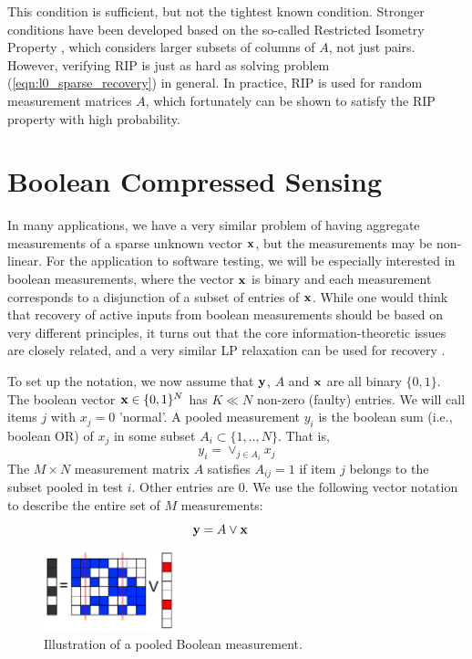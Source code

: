 This condition is sufficient, but not the tightest known condition.
Stronger conditions have been developed based on the so-called Restricted Isometry Property
\cite{candes2008_RIP}, which considers larger subsets of columns of $A$, not just pairs.
However, verifying RIP is just as hard as solving problem (\ref{eqn:l0_sparse_recovery}) in general. In practice, RIP is used for random measurement
matrices $A$, which fortunately can be shown to satisfy the RIP property with high probability.

\section{ Boolean Compressed Sensing}
\label{s:boolean_compressed_sensing}
In many applications, we have a very similar problem of having aggregate measurements
of a sparse unknown vector $\mathbf{x}$, but the measurements may be non-linear.  For the application
to software testing, we will be especially interested in boolean measurements, where the
vector $\mathbf{x}$ is binary and each measurement corresponds to a disjunction of a subset
of entries of $\mathbf{x}$.  While one would think that recovery of active inputs from
boolean measurements should be based on very different principles, it turns
out that the core information-theoretic issues are closely related, and a very similar LP relaxation can be used for recovery \cite{Malyutov78,MalioutovM2012}.

To set up the notation, we now assume that $\mathbf{y}$, $A$ and $\mathbf{x}$ are all binary $\{0, 1\}$.
The boolean vector $\mathbf{x} \in \{0, 1\}^N$ has $K \ll N$ non-zero (faulty) entries.
We will call items $j$ with $x_j = 0$ 'normal'. A pooled measurement $y_i$ is the
boolean sum (i.e., boolean OR) of $x_j$ in some subset $A_i \subset \{1,..,N\}$. That is,
\begin{equation}
y_i = \vee_{j \in A_i} x_j
\end{equation}
The $M \times N$ measurement matrix $A$ satisfies $A_{ij} = 1$ if item $j$ belongs
to the subset pooled in test $i$. Other entries are $0$. We use the following vector
notation to describe the entire set of $M$ measurements:
\begin{equation*}
\mathbf{y} = A \vee \mathbf{x}~~~~~~~~
\end{equation*}

\begin{figure}[!thb]
\centering
\includegraphics[width=1.5in]{./fig_group_test.pdf}
\caption{  Illustration of a pooled Boolean measurement.}
\label{fig:group_testing}
\end{figure}

